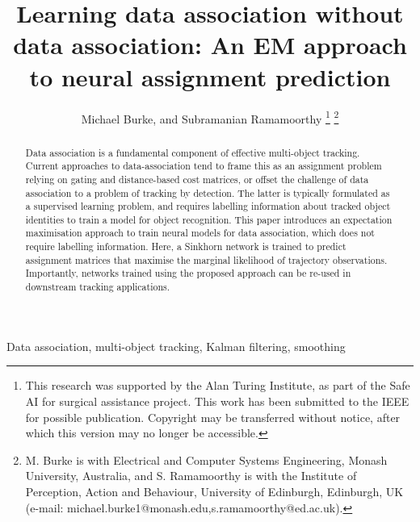 \documentclass[journal]{IEEEtran}
\begin{document}
\title{Learning data association without data association: An EM approach to neural assignment prediction}

\author{Michael Burke, and Subramanian Ramamoorthy
\thanks{This research was supported by the Alan Turing Institute, as part of the Safe AI for surgical assistance project. This work has been submitted to the IEEE for possible publication. Copyright may be transferred without notice, after which this version may no longer be accessible.}
\thanks{M. Burke is with Electrical and Computer Systems Engineering, Monash University, Australia, and S. Ramamoorthy is with the Institute of Perception, Action and Behaviour, University of Edinburgh, Edinburgh, UK (e-mail: michael.burke1@monash.edu,s.ramamoorthy@ed.ac.uk).}}

\maketitle

\begin{abstract}
Data association is a fundamental component of effective multi-object tracking. Current approaches to data-association tend to frame this as an assignment problem relying on gating and distance-based cost matrices, or offset the challenge of data association to a problem of tracking by detection. The latter is typically formulated as a supervised learning problem, and requires labelling information about tracked object identities to train a model for object recognition. This paper introduces an expectation maximisation approach to train neural models for data association, which does not require labelling information. Here, a Sinkhorn network is trained to predict assignment matrices that maximise the marginal likelihood of trajectory observations. Importantly, networks trained using the proposed approach can be re-used in downstream tracking applications.
\end{abstract}

\begin{IEEEkeywords}
Data association, multi-object tracking, Kalman filtering, smoothing
\end{IEEEkeywords}


\IEEEpeerreviewmaketitle
\end{document}
